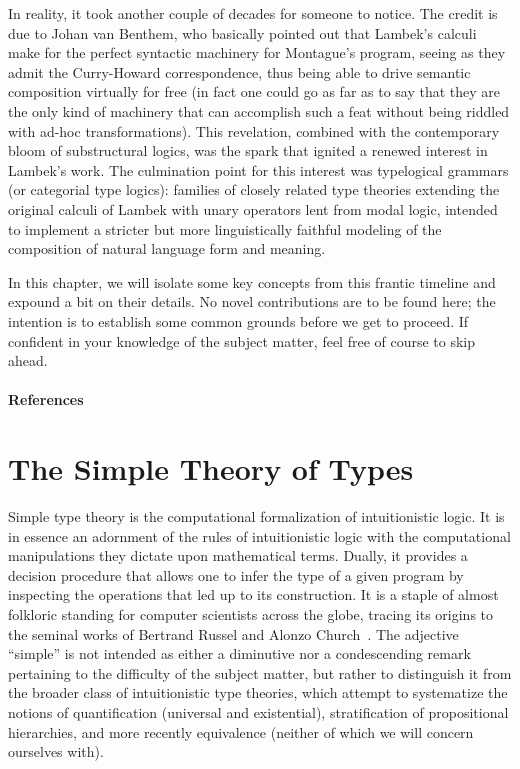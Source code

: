 In reality, it took another couple of decades for someone to notice.
The credit is due to Johan van Benthem, who basically pointed out that Lambek's calculi make for the perfect syntactic machinery for Montague's program, seeing as they admit the Curry-Howard correspondence, thus being able to drive semantic composition virtually for free (in fact one could go as far as to say that they are the only kind of machinery that can accomplish such a feat without being riddled with ad-hoc transformations).
This revelation, combined with the contemporary bloom of substructural logics, was the spark that ignited a renewed interest in Lambek's work.
The culmination point for this interest was typelogical grammars (or categorial type logics): families of closely related type theories extending the original calculi of Lambek with unary operators lent from modal logic, intended to implement a stricter but more linguistically faithful modeling of the composition of natural language form and meaning.

In this chapter, we will isolate some key concepts from this frantic timeline and expound a bit on their details.
No novel contributions are to be found here; the intention is to establish some common grounds before we get to proceed. 
If confident in your knowledge of the subject matter, feel free of course to skip ahead.

\paragraph{References}

\newpage

\section{The Simple Theory of Types}

Simple type theory is the computational formalization of intuitionistic logic. 
It is in essence an adornment of the rules of intuitionistic logic with the computational manipulations they dictate upon mathematical terms.
Dually, it provides a decision procedure that allows one to infer the type of a given program by inspecting the operations that led up to its construction.
It is a staple of almost folkloric standing for computer scientists across the globe, tracing its origins to the seminal works of Bertrand Russel and Alonzo Church~\cite{russel1908,church1940}.
The adjective ``simple'' is not intended as either a diminutive nor a condescending remark pertaining to the difficulty of the subject matter, but rather to distinguish it from the broader class of intuitionistic type theories, which attempt to systematize the notions of quantification (universal and existential), stratification of propositional hierarchies, and more recently equivalence (neither of which we will concern ourselves with).

